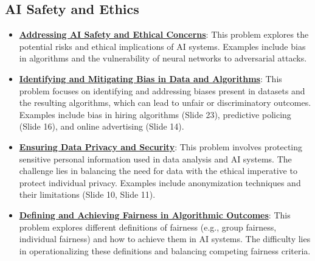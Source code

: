 \documentclass{article}%
\begin{document}
%
\subsection{AI Safety and Ethics}%
\label{subsec:AISafetyandEthics}%
\begin{itemize}[leftmargin=*]%
\item \href{https://purdue.brightspace.com/d2l/common/assets/pdfjs-d2l-dist/1.0.14-legacy/web/viewer.html?file=\%2Fcontent\%2Fenforced\%2F1095467-wl.202510.CS.24300.001\%2F02L2-Intro.pdf\%3Fou\%3D1095467\&lang=en-us\&container=d2l-fileviewer-rendered-pdf\&fullscreen=d2l-fileviewer-rendered-pdf-dialog\&height=667#page=19}{\textbf{Addressing AI Safety and Ethical Concerns}}: This problem explores the potential risks and ethical implications of AI systems. Examples include bias in algorithms and the vulnerability of neural networks to adversarial attacks.%
\item \href{https://purdue.brightspace.com/d2l/common/assets/pdfjs-d2l-dist/1.0.14-legacy/web/viewer.html?file=\%2Fcontent\%2Fenforced\%2F1095467-wl.202510.CS.24300.001\%2F16L2-ethics.pdf\%3Fou\%3D1095467\&lang=en-us\&container=d2l-fileviewer-rendered-pdf\&fullscreen=d2l-fileviewer-rendered-pdf-dialog\&height=667#page=2}{\textbf{Identifying and Mitigating Bias in Data and Algorithms}}: This problem focuses on identifying and addressing biases present in datasets and the resulting algorithms, which can lead to unfair or discriminatory outcomes. Examples include bias in hiring algorithms (Slide 23), predictive policing (Slide 16), and online advertising (Slide 14).%
\item \href{https://purdue.brightspace.com/d2l/common/assets/pdfjs-d2l-dist/1.0.14-legacy/web/viewer.html?file=\%2Fcontent\%2Fenforced\%2F1095467-wl.202510.CS.24300.001\%2F16L2-ethics.pdf\%3Fou\%3D1095467\&lang=en-us\&container=d2l-fileviewer-rendered-pdf\&fullscreen=d2l-fileviewer-rendered-pdf-dialog\&height=667#page=10}{\textbf{Ensuring Data Privacy and Security}}: This problem involves protecting sensitive personal information used in data analysis and AI systems. The challenge lies in balancing the need for data with the ethical imperative to protect individual privacy. Examples include anonymization techniques and their limitations (Slide 10, Slide 11).%
\item \href{https://purdue.brightspace.com/d2l/common/assets/pdfjs-d2l-dist/1.0.14-legacy/web/viewer.html?file=\%2Fcontent\%2Fenforced\%2F1095467-wl.202510.CS.24300.001\%2F16L2-ethics.pdf\%3Fou\%3D1095467\&lang=en-us\&container=d2l-fileviewer-rendered-pdf\&fullscreen=d2l-fileviewer-rendered-pdf-dialog\&height=667#page=18}{\textbf{Defining and Achieving Fairness in Algorithmic Outcomes}}: This problem explores different definitions of fairness (e.g., group fairness, individual fairness) and how to achieve them in AI systems. The difficulty lies in operationalizing these definitions and balancing competing fairness criteria.%

\end{itemize}
\end{document}
